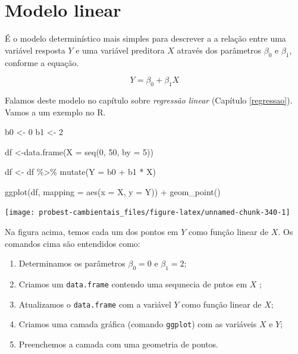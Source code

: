 \documentclass[
]{book}
\newenvironment{Shaded}{\begin{snugshade}}{\end{snugshade}}
\newcommand{\AttributeTok}[1]{\textcolor[rgb]{0.77,0.63,0.00}{#1}}
\newcommand{\DecValTok}[1]{\textcolor[rgb]{0.00,0.00,0.81}{#1}}
\newcommand{\FunctionTok}[1]{\textcolor[rgb]{0.00,0.00,0.00}{#1}}
\newcommand{\NormalTok}[1]{#1}
\newcommand{\OtherTok}[1]{\textcolor[rgb]{0.56,0.35,0.01}{#1}}
\newcommand{\SpecialCharTok}[1]{\textcolor[rgb]{0.00,0.00,0.00}{#1}}
\begin{document}
\hypertarget{modelo-linear}{%
\section{Modelo linear}\label{modelo-linear}}

É o modelo determinístico mais simples para descrever a a relação entre uma variável resposta \(Y\) e uma variável preditora \(X\) através dos parâmetros \(\beta_0\) e \(\beta_1\), conforme a equação.

\[Y = \beta_0 + \beta_1X\]

Falamos deste modelo no capítulo sobre \emph{regressão linear} (Capítulo \ref{regressao}).
Vamos a um exemplo no R.

\begin{Shaded}
\begin{Highlighting}[]
\NormalTok{b0 }\OtherTok{\textless{}{-}} \DecValTok{0}
\NormalTok{b1 }\OtherTok{\textless{}{-}} \DecValTok{2}

\NormalTok{df }\OtherTok{\textless{}{-}}\FunctionTok{data.frame}\NormalTok{(}\AttributeTok{X =} \FunctionTok{seq}\NormalTok{(}\DecValTok{0}\NormalTok{, }\DecValTok{50}\NormalTok{, }\AttributeTok{by =} \DecValTok{5}\NormalTok{))}

\NormalTok{df }\OtherTok{\textless{}{-}}\NormalTok{ df }\SpecialCharTok{\%\textgreater{}\%} \FunctionTok{mutate}\NormalTok{(}\AttributeTok{Y =}\NormalTok{ b0 }\SpecialCharTok{+}\NormalTok{ b1 }\SpecialCharTok{*}\NormalTok{ X)}

\FunctionTok{ggplot}\NormalTok{(df, }\AttributeTok{mapping =} \FunctionTok{aes}\NormalTok{(}\AttributeTok{x =}\NormalTok{ X, }\AttributeTok{y =}\NormalTok{ Y)) }\SpecialCharTok{+}
  \FunctionTok{geom\_point}\NormalTok{()}
\end{Highlighting}
\end{Shaded}

\begin{center}\texttt{[image: probest-cambientais\_files/figure-latex/unnamed-chunk-340-1]} \end{center}

Na figura acima, temos cada um dos pontos em \(Y\) como função linear de \(X\). Os comandos cima são entendidos como:

\begin{enumerate}
\def\labelenumi{\arabic{enumi}.}
\item
  Determinamos os parâmetros \(\beta_0 = 0\) e \(\beta_1 = 2\);
\item
  Criamos um \texttt{data.frame} contendo uma sequnecia de pntos em \(X\) ;
\item
  Atualizamos o \texttt{data.frame} com a variável \(Y\) como função linear de \(X\);
\item
  Criamos uma camada gráfica (comando \texttt{ggplot}) com as variáveis \(X\) e \(Y\);
\item
  Preenchemos a camada com uma geometria de pontos.
\end{enumerate}
\end{document}
